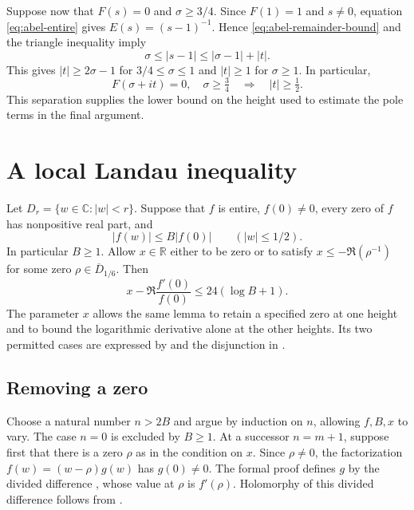 Suppose now that \(F(s)=0\) and \(\sigma\geq 3/4\).
Since \(F(1)=1\) and \(s\ne 0\), equation \eqref{eq:abel-entire} gives
\(E(s)=(s-1)^{-1}\). Hence \eqref{eq:abel-remainder-bound} and the triangle
inequality imply
\[
  \sigma \leq |s-1|\leq |\sigma-1|+|t|.
\]
This gives \(|t|\geq 2\sigma-1\) for \(3/4\leq\sigma\leq 1\)
and \(|t|\geq1\) for \(\sigma\geq1\). In particular,
\begin{equation}
  F(\sigma+it)=0,\quad \sigma\geq\tfrac34
  \quad\Longrightarrow\quad |t|\geq\tfrac12 .
  \label{eq:height-separation}
\end{equation}
This separation supplies the lower bound on the height used to estimate
the pole terms in the final argument.

\section{A local Landau inequality}
\label{sec:landau-disk}

Let \(D_r=\{w\in\mathbb C:|w|<r\}\). Suppose that \(f\) is entire,
\(f(0)\ne0\), every zero of \(f\) has nonpositive real part, and
\[
  |f(w)|\leq B|f(0)|\qquad (|w|\leq 1/2).
\]
In particular \(B\geq1\). Allow \(x\in\mathbb R\) either to be zero or to
satisfy \(x\leq-\Re(\rho^{-1})\) for some zero
\(\rho\in\overline D_{1/6}\). Then
\begin{equation}
  x-\Re\frac{f'(0)}{f(0)}\leq 24(\log B+1).
  \label{eq:landau-disk}
\end{equation}
The parameter \(x\) allows the same lemma to retain a specified zero at
one height and to bound the logarithmic derivative alone at the other
heights. Its two permitted cases are expressed by  and
the disjunction in .

\subsection{Removing a zero}
\label{sec:landau-peel}

Choose a natural number \(n>2B\) and argue by induction on \(n\), allowing
\(f,B,x\) to vary. The case \(n=0\) is excluded by \(B\geq1\).
At a successor \(n=m+1\), suppose first that there is a zero \(\rho\)
as in the condition on \(x\). Since \(\rho\ne0\), the factorization
\(f(w)=(w-\rho)g(w)\) has \(g(0)\ne0\). The formal proof defines \(g\)
by the divided difference , whose value at \(\rho\) is \(f'(\rho)\).
Holomorphy of this divided difference follows from
.

